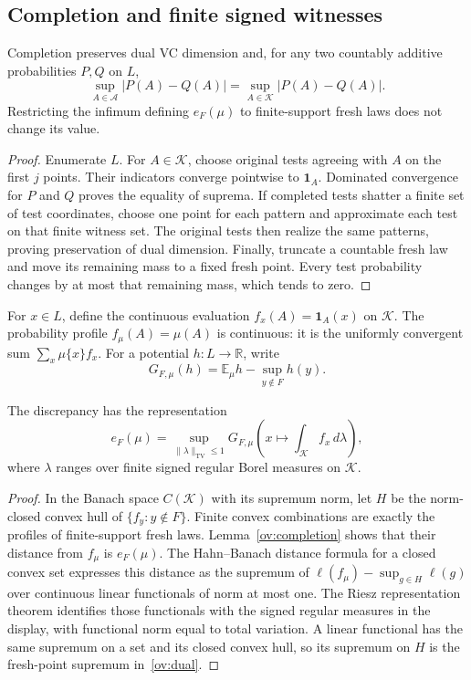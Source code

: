 \subsection{Completion and finite signed witnesses}
\begin{lemma}\label{ov:completion}
Completion preserves dual VC dimension and, for any two countably additive probabilities $P,Q$ on $L$,
\[
 \sup_{A\in\mathcal A}|P(A)-Q(A)|
 =\sup_{A\in\mathcal K}|P(A)-Q(A)|.
\]
Restricting the infimum defining $e_F(\mu)$ to finite-support fresh laws does not change its value.
\end{lemma}
\begin{proof}
Enumerate $L$. For $A\in\mathcal K$, choose original tests agreeing with $A$ on the first $j$ points. Their indicators converge pointwise to $\mathbf1_A$. Dominated convergence for $P$ and $Q$ proves the equality of suprema. If completed tests shatter a finite set of test coordinates, choose one point for each pattern and approximate each test on that finite witness set. The original tests then realize the same patterns, proving preservation of dual dimension. Finally, truncate a countable fresh law and move its remaining mass to a fixed fresh point. Every test probability changes by at most that remaining mass, which tends to zero.
\end{proof}

For $x\in L$, define the continuous evaluation $f_x(A)=\mathbf1_A(x)$ on $\mathcal K$. The probability profile $f_\mu(A)=\mu(A)$ is continuous: it is the uniformly convergent sum $\sum_x\mu\{x\}f_x$. For a potential $h:L\to\mathbb R$, write
\[
 G_{F,\mu}(h)=\mathbb E_\mu h-\sup_{y\notin F}h(y).
\]

\begin{lemma}[Separation]\label{ov:separation}
The discrepancy has the representation
\begin{equation}\label{ov:dual}
 e_F(\mu)=\sup_{\|\lambda\|_{\mathrm{TV}}\le1}
 G_{F,\mu}\left(x\mapsto\int_{\mathcal K}f_x\,d\lambda\right),
\end{equation}
where $\lambda$ ranges over finite signed regular Borel measures on $\mathcal K$.
\end{lemma}
\begin{proof}
In the Banach space $C(\mathcal K)$ with its supremum norm, let $H$ be the norm-closed convex hull of $\{f_y:y\notin F\}$. Finite convex combinations are exactly the profiles of finite-support fresh laws. Lemma~\ref{ov:completion} shows that their distance from $f_\mu$ is $e_F(\mu)$. The Hahn--Banach distance formula for a closed convex set expresses this distance as the supremum of $\ell(f_\mu)-\sup_{g\in H}\ell(g)$ over continuous linear functionals of norm at most one. The Riesz representation theorem identifies those functionals with the signed regular measures in the display, with functional norm equal to total variation. A linear functional has the same supremum on a set and its closed convex hull, so its supremum on $H$ is the fresh-point supremum in~\eqref{ov:dual}.
\end{proof}

